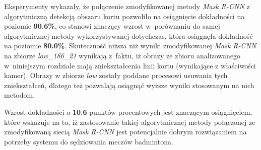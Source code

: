 Eksperymenty wykazały, że połączenie zmodyfikowanej metody \textit{Mask R-CNN} z algorytmiczną detekcją obszaru kortu pozwoliło na osiągnięcie dokładności na poziomie \textbf{90.6\%}, co stanowi znaczący wzrost w~porównaniu do samej algorytmicznej metody wykorzystywanej dotychczas, która osiągnęła dokładność na poziomie \textbf{80.0\%}.
Skuteczność niższa niż wyniki zmodyfikowanej \textit{Mask R-CNN} na zbiorze \textit{low\_186\_21} wynikają z~faktu, iż obrazy ze zbioru analizowanego w~niniejszym rozdziale mają zniekształcenia linii kortu (wynikające z właściwości kamer). Obrazy w zbiorze \textit{low} zostały poddane procesowi usuwania tych zniekształceń, dlatego też pozwalają osiągnąć wyższe wyniki stosowanym na nich metodom.

Wzrost dokładności o \textbf{10.6} punktów procentowych jest znaczącym osiągnięciem, które wskazuje na to, iż zastosowanie takiej algorytmicznej metody połączonej ze zmodyfikowaną siecią \textit{Mask R-CNN} jest potencjalnie dobrym rozwiązaniem na potrzeby systemu do sędziowania meczów badmintona.
